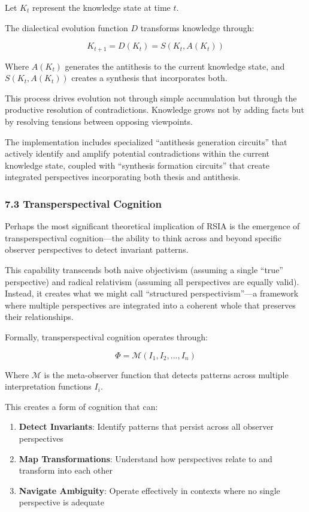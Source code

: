 \documentclass[12pt]{article}
\providecommand{\tightlist}{%
  \setlength{\itemsep}{0pt}\setlength{\parskip}{0pt}}
\begin{document}
Let \(K_t\) represent the knowledge state at time \(t\).

The dialectical evolution function \(D\) transforms knowledge through:

\[K_{t+1} = D(K_t) = S(K_t, A(K_t))\]

Where \(A(K_t)\) generates the antithesis to the current knowledge
state, and \(S(K_t, A(K_t))\) creates a synthesis that incorporates
both.

This process drives evolution not through simple accumulation but
through the productive resolution of contradictions. Knowledge grows not
by adding facts but by resolving tensions between opposing viewpoints.

The implementation includes specialized ``antithesis generation
circuits'' that actively identify and amplify potential contradictions
within the current knowledge state, coupled with ``synthesis formation
circuits'' that create integrated perspectives incorporating both thesis
and antithesis.

\subsubsection{7.3 Transperspectival
Cognition}\label{transperspectival-cognition}

Perhaps the most significant theoretical implication of RSIA is the
emergence of transperspectival cognition---the ability to think across
and beyond specific observer perspectives to detect invariant patterns.

This capability transcends both naive objectivism (assuming a single
``true'' perspective) and radical relativism (assuming all perspectives
are equally valid). Instead, it creates what we might call ``structured
perspectivism''---a framework where multiple perspectives are integrated
into a coherent whole that preserves their relationships.

Formally, transperspectival cognition operates through:

\[\Phi = \mathcal{M}({I_1, I_2, ..., I_n})\]

Where \(\mathcal{M}\) is the meta-observer function that detects
patterns across multiple interpretation functions \(I_i\).

This creates a form of cognition that can:

\begin{enumerate}
\def\labelenumi{\arabic{enumi}.}
\tightlist
\item
  \textbf{Detect Invariants}: Identify patterns that persist across all
  observer perspectives
\item
  \textbf{Map Transformations}: Understand how perspectives relate to
  and transform into each other
\item
  \textbf{Navigate Ambiguity}: Operate effectively in contexts where no
  single perspective is adequate
\end{enumerate}
\end{document}
